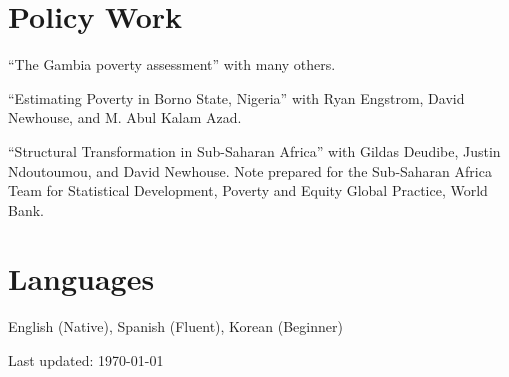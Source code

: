 \documentclass{article}
\renewenvironment{itemize}{
  \begin{list}{}{
    \setlength{\leftmargin}{0em}
  }
}{
  \end{list}
}
\begin{document}
{\section*{Policy Work}
\vspace{-4mm}
\hrulefill
\begin{itemize}
	\item ``The Gambia poverty assessment'' with many others.
	\item ``Estimating Poverty in Borno State, Nigeria'' with Ryan Engstrom, David Newhouse, and M. Abul Kalam Azad.
	\item ``Structural Transformation in Sub-Saharan Africa'' with Gildas Deudibe, Justin Ndoutoumou, and David Newhouse. Note prepared for the Sub-Saharan Africa Team for Statistical Development, Poverty and Equity Global Practice, World Bank.
\end{itemize}


\vspace{0.5mm}

\section*{Languages}
\vspace{-4mm}
\hrulefill
\begin{itemize}
	\item English (Native), Spanish (Fluent), Korean (Beginner)
\end{itemize}

\vspace{0.5mm}


\vfill

\begin{center}
  \begin{footnotesize}
    Last updated: \today \\
  \end{footnotesize}
\end{center}
\end{document}
